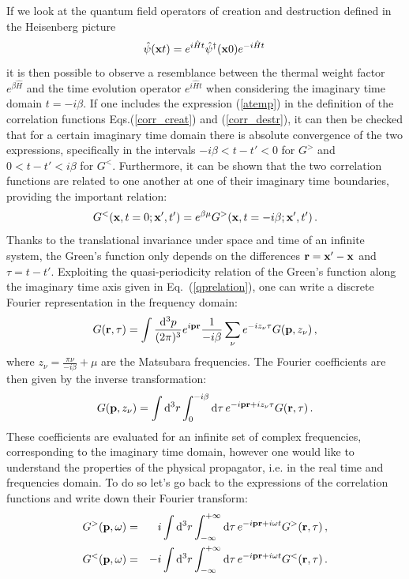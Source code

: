 If we look at the quantum field operators of creation and destruction defined in the Heisenberg picture
\begin{equation}
\label{atemp}
\hat\psi({\bf x}t)=e^{i\hat Ht}\hat\psi^\dagger({\bf x}0)e^{-i\hat Ht}\,
\end{equation}
it is then possible to observe a resemblance between the thermal weight factor $e^{\beta\hat H}$ and the time evolution operator $e^{i\hat Ht}$ when considering the imaginary time domain $t=-i\beta$. If one includes the expression (\ref{atemp}) in the definition of the correlation functions Eqs.(\ref{corr_creat}) and (\ref{corr_destr}), it can then be checked that for a certain imaginary time domain there is absolute convergence of the two expressions, specifically in the intervals $-i\beta<t-t'<0$ for $G^>$ and $0<t-t'<i\beta$ for $G^<$. Furthermore, it can be shown that the two correlation functions are related to one another at one of their imaginary time boundaries, providing the important relation: 
\begin{equation}
\label{qprelation}
G^<({\bf x},t=0;{\bf x'}, t')=e^{\beta\mu}G^>({\bf x},t=-i\beta;{\bf x'},t')\,.
\end{equation}
Thanks to the translational invariance under space and time of an infinite system, the Green's function only depends on the differences ${\bf r}={\bf x'}-{\bf x}$ and $\tau=t-t'$. Exploiting the quasi-periodicity relation of the Green's function along the imaginary time axis given in Eq.~(\ref{qprelation}), one can write a discrete Fourier representation in the frequency domain:
\begin{equation}
G({\bf r},\tau)=\int \frac{{\rm d}^3p}{(2\pi)^3}e^{i{\bf p}{\bf r}}\frac{1}{-i\beta}\sum_\nu e^{-iz_\nu\tau}G({\bf p},z_\nu)\,,
\end{equation}
where $z_\nu=\frac{\pi\nu}{-i\beta}+\mu$ are the Matsubara frequencies. The Fourier coefficients are then given by the inverse transformation:
\begin{equation}
\label{Fouriercoeff}
G({\bf p},z_\nu)=\int {\rm d}^3r\int_0^{-i\beta}{\rm d}\tau\,e^{-i{\bf p}{\bf r}+iz_\nu\tau}G({\bf r},\tau)\,.
\end{equation}
These coefficients are evaluated for an infinite set of complex frequencies, corresponding to the imaginary time domain, however one would like to understand the properties of the physical propagator, i.e. in the real time and frequencies domain. To do so let's go back to the expressions of the correlation functions and write down their Fourier transform:
\begin{eqnarray}
\label{FTpart}
G^>({\bf p},\omega) &=& i\int{\rm d}^3r\int_{-\infty}^{+\infty}{\rm d}\tau\,e^{-i{\bf pr}+i\omega t}G^>({\bf r},\tau)\,,\\
\label{FThole}
G^<({\bf p},\omega) &=& -i\int{\rm d}^3r\int_{-\infty}^{+\infty}{\rm d}\tau\,e^{-i{\bf pr}+i\omega t}G^<({\bf r},\tau)\,.
\end{eqnarray}
